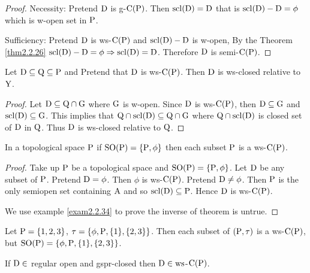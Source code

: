 \begin{proof}
Necessity: Pretend $\mathrm{D}$ is g-$\mathrm{C}(\mathrm{P})$. Then $\mathrm{scl}(\mathrm{D})=\mathrm{D}$ that is $\mathrm{scl}(\mathrm{D})-\mathrm{D}=\phi$ which is w-open set in $\mathrm{P}$.

Sufficiency: Pretend $\mathrm{D}$ is ws-$\mathrm{C}(\mathrm{P})$ and $\mathrm{scl}(\mathrm{D})-\mathrm{D}$ is w-open, By the Theorem \ref{thm2.2.26} $\mathrm{scl}(\mathrm{D})-\mathrm{D}=\phi\Rightarrow \mathrm{scl}(\mathrm{D})=\mathrm{D}$. Therefore $\mathrm{D}$ is semi-$\mathrm{C}(\mathrm{P})$.
\end{proof}

\begin{thm}\label{thm2.2.32}
Let $\mathrm{D}\subseteq \mathrm{Q}\subseteq \mathrm{P}$ and Pretend that $\mathrm{D}$ is ws-$\mathrm{C}(\mathrm{P})$. Then $\mathrm{D}$ is ws-closed relative to $\mathrm{Y}$.
\end{thm}

\begin{proof}
Let $\mathrm{D}\subseteq \mathrm{Q}\cap \mathrm{G}$ where $\mathrm{G}$ is w-open. Since $\mathrm{D}$ is ws-$\mathrm{C}(\mathrm{P})$, then $\mathrm{D}\subseteq \mathrm{G}$ and $\mathrm{scl}(\mathrm{D})\subseteq \mathrm{G}$. This
implies that $\mathrm{Q} \cap \mathrm{scl}(\mathrm{D}) \subseteq \mathrm{Q}\cap \mathrm{G}$ where $\mathrm{Q} \cap \mathrm{scl}(\mathrm{D})$ is closed set of $\mathrm{D}$ in $\mathrm{Q}$. Thus $\mathrm{D}$ is ws-closed
relative to $\mathrm{Q}$.
\end{proof}

\begin{thm}\label{thm2.2.33}
In a topological space $\mathrm{P}$ if $\mathrm{SO}(\mathrm{P}) =\{\mathrm{P}, \phi\}$ then each subset $\mathrm{P}$ is a ws-$\mathrm{C}(\mathrm{P})$.
\end{thm}

\begin{proof}
Take up $\mathrm{P}$ be a topological space and $\mathrm{SO}(\mathrm{P})=\{\mathrm{P}, \phi\}$. Let $\mathrm{D}$ be any subset of $\mathrm{P}$. Pretend $\mathrm{D}=\phi$. Then $\phi$ is ws-$\mathrm{C}(\mathrm{P})$. Pretend $\mathrm{D}\neq\phi$. Then $\mathrm{P}$  is the only semiopen set containing $\mathrm{A}$ and so $\mathrm{scl}(\mathrm{D})\subseteq \mathrm{P}$. Hence $\mathrm{D}$ is ws-$\mathrm{C}(\mathrm{P})$. 

We use example \ref{exam2.2.34} to prove the inverse of theorem is untrue.
\end{proof}

\begin{exm}\label{exam2.2.34}
Let $\mathrm{P}  = \{1, 2, 3\}$, $\tau = \{\phi, \mathrm{P}, \{1\}, \{2, 3\}\}$. Then each subset of $(\mathrm{P},\tau)$ is a ws-$\mathrm{C}(\mathrm{P})$, but $\mathrm{SO}(\mathrm{P})= \{\phi, \mathrm{P}, \{1\}, \{2, 3\}\}$.
\end{exm}

\begin{thm}\label{thm2.2.35}
If $\mathrm{D}\in$ regular open and gspr-closed then $\mathrm{D}\in\mathrm{ws}$-$\mathrm{C}(\mathrm{P})$.
\end{thm}

